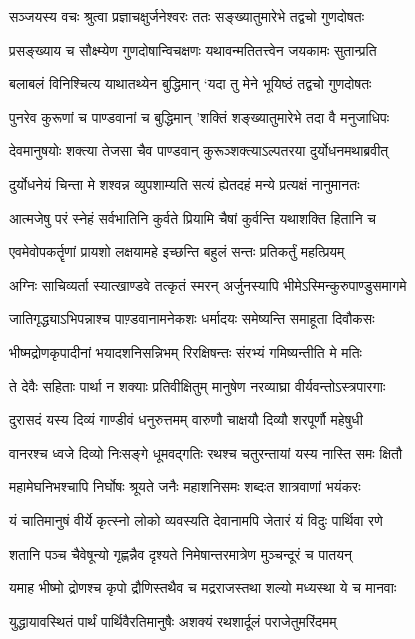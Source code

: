 \twolineshloka
{सञ्जयस्य वचः श्रुत्वा प्रज्ञाचक्षुर्जनेश्वरः}
{ततः सङ्ख्यातुमारेभे तद्वचो गुणदोषतः}


\twolineshloka
{प्रसङ्ख्याय च सौक्ष्म्येण गुणदोषान्विचक्षणः}
{यथावन्मतितत्त्वेन जयकामः सुतान्प्रति}


\twolineshloka
{बलाबलं विनिश्चित्य याथातथ्येन बुद्धिमान्}
{`यदा तु मेने भूयिष्ठं तद्वचो गुणदोषतः}


\twolineshloka
{पुनरेव कुरूणां च पाण्डवानां च बुद्धिमान्}
{'शक्तिं शङ्ख्यातुमारेभे तदा वै मनुजाधिपः}


\twolineshloka
{देवमानुषयोः शक्त्या तेजसा चैव पाण्डवान्}
{कुरूञ्शक्त्याऽल्पतरया दुर्योधनमथाब्रवीत्}


\twolineshloka
{दुर्योधनेयं चिन्ता मे शश्वन्न व्युपशाम्यति}
{सत्यं ह्येतदहं मन्ये प्रत्यक्षं नानुमानतः}


\twolineshloka
{आत्मजेषु परं स्नेहं सर्वभातिनि कुर्वते}
{प्रियामि चैषां कुर्वन्ति यथाशक्ति हितानि च}


\twolineshloka
{एवमेवोपकर्तॄणां प्रायशो लक्षयामहे}
{इच्छन्ति बहुलं सन्तः प्रतिकर्तुं महत्प्रियम्}


\twolineshloka
{अग्निः साचिव्यर्ता स्यात्खाण्डवे तत्कृतं स्मरन्}
{अर्जुनस्यापि भीमेऽस्मिन्कुरुपाण्डुसमागमे}


\twolineshloka
{जातिगृद्ध्याऽभिपन्नाश्च पाण़्डवानामनेकशः}
{धर्मादयः समेष्यन्ति समाहूता दिवौकसः}


\twolineshloka
{भीष्मद्रोणकृपादीनां भयादशनिसन्निभम्}
{रिरक्षिषन्तः संरभ्यं गमिष्यन्तीति मे मतिः}


\twolineshloka
{ते देवैः सहिताः पार्था न शक्याः प्रतिवीक्षितुम्}
{मानुषेण नरव्याघ्रा वीर्यवन्तोऽस्त्रपारगाः}


\twolineshloka
{दुरासदं यस्य दिव्यं गाण्डीवं धनुरुत्तमम्}
{वारुणौ चाक्षयौ दिव्यौ शरपूर्णौ महेषुधी}


\twolineshloka
{वानरश्च ध्वजे दिव्यो निःसङ्गे धूमवद्गतिः}
{रथश्च चतुरन्तायां यस्य नास्ति समः क्षितौ}


\twolineshloka
{महामेघनिभश्चापि निर्घोषः श्रूयते जनैः}
{महाशनिसमः शब्दःत शात्रवाणां भयंकरः}


\twolineshloka
{यं चातिमानुषं वीर्ये कृत्स्नो लोको व्यवस्यति}
{देवानामपि जेतारं यं विदुः पार्थिवा रणे}


\twolineshloka
{शतानि पञ्च चैवेषून्यो गृह्णन्नैव दृश्यते}
{निमेषान्तरमात्रेण मुञ्चन्दूरं च पातयन्}


\twolineshloka
{यमाह भीष्मो द्रोणश्च कृपो द्रौणिस्तथैव च}
{मद्रराजस्तथा शल्यो मध्यस्था ये च मानवाः}


\twolineshloka
{युद्धायावस्थितं पार्थं पार्थिवैरतिमानुषैः}
{अशक्यं रथशार्दूलं पराजेतुमरिंदमम्}


